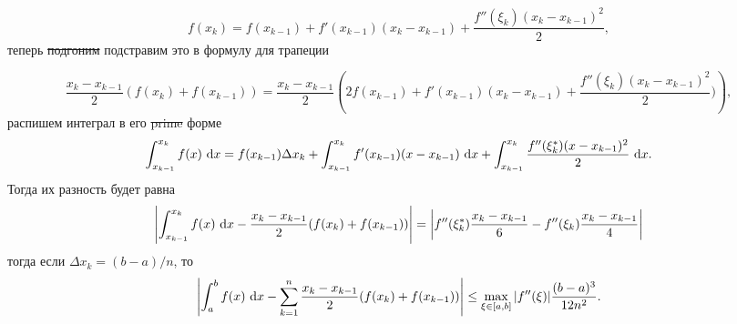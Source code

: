 \documentclass{report}
\begin{document}
\begin{enumerate}
\[
f(x_k) = f(x_{k-1})+f'(x_{k-1})(x_k-x_{k-1})+\dfrac{f''(\xi_k)(x_k-x_{k-1})^2}{2},
\]
теперь \sout{подгоним} подстравим это в формулу для трапеции

\[
\dfrac{x_k-x_{k-1}}{2}(f(x_k)+f(x_{k-1})) = \dfrac{x_k-x_{k-1}}{2}\left(2f(x_{k-1})+f'(x_{k-1})(x_k-x_{k-1})+\dfrac{f''(\xi_k)(x_k-x_{k-1})^2}{2})\right),
\]
распишем интеграл в его \sout{prime} форме
\[
\int _{x_{k-1}}^{x_k} f(x) \, \dl x = f(x_{k-1})\Delta x_k + \int _{x_{k-1}}^{x_k} f'(x_{k-1})(x-x_{k-1}) \, \dl x + \int _{x_{k-1}}^{x_k} \dfrac{f''(\xi_k^*)(x-x_{k-1})^2}{2} \, \dl x.
\]
Тогда их разность будет равна
\[
    \left|\int_{x_{k-1}}^{x_k} f(x) \, \dl x - \dfrac{x_k-x_{k-1}}{2}(f(x_k)+f(x_{k-1}))\right| = \left|f''(\xi_k^*)\dfrac{x_k-x_{k-1}}{6} - f''(\xi_k)\dfrac{x_k-x_{k-1}}{4}\right|
\]
тогда если $\Delta x_k = (b-a)/n$, то
\[
    \left|\int_{a}^{b} f(x) \, \dl x - \sum_{k=1}^{n} \dfrac{x_k-x_{k-1}}{2}(f(x_k)+f(x_{k-1}))\right| \le \max_{\xi \in [a, b]}|f''(\xi)|\dfrac{(b-a)^3}{12n^2}.
\]

\end{enumerate}
\end{document}
